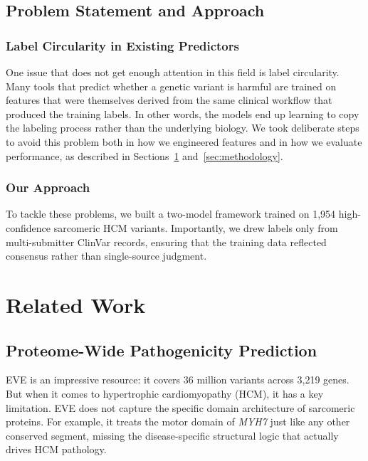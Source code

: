 \documentclass[conference]{IEEEtran}
\begin{document}
\subsection{Problem Statement and Approach}

\subsubsection{Label Circularity in Existing Predictors}
One issue that does not get enough attention in this field is label circularity. Many tools that predict whether a genetic variant is harmful are trained on features that were themselves derived from the same clinical workflow that produced the training labels. In other words, the models end up learning to copy the labeling process rather than the underlying biology. We took deliberate steps to avoid this problem both in how we engineered features and in how we evaluate performance, as described in Sections~\ref{sec:related} and~\ref{sec:methodology}.

\subsubsection{Our Approach}
To tackle these problems, we built a two-model framework trained on 1,954 high-confidence sarcomeric HCM variants. Importantly, we drew labels only from multi-submitter ClinVar records, ensuring that the training data reflected consensus rather than single-source judgment.


\section{Related Work}
\label{sec:related}

\subsection{Proteome-Wide Pathogenicity Prediction}

EVE \cite{frazer2021eve} is an impressive resource: it covers 36 million variants across 3,219 genes. But when it comes to hypertrophic cardiomyopathy (HCM), it has a key limitation. EVE does not capture the specific domain architecture of sarcomeric proteins. For example, it treats the motor domain of \textit{MYH7} just like any other conserved segment, missing the disease-specific structural logic that actually drives HCM pathology.
\end{document}

